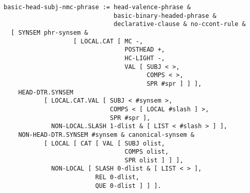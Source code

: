 \documentclass[a4paper]{article}
\begin{document}
{\small\begin{verbatim}
basic-head-subj-nmc-phrase := head-valence-phrase & 
                              basic-binary-headed-phrase &
                              declarative-clause & no-ccont-rule &
  [ SYNSEM phr-synsem & 
                   [ LOCAL.CAT [ MC -,
                                 POSTHEAD +,
                                 HC-LIGHT -,
                                 VAL [ SUBJ < >,
                                       COMPS < >,
                                       SPR #spr ] ] ],
    HEAD-DTR.SYNSEM 
           [ LOCAL.CAT.VAL [ SUBJ < #synsem >,
                             COMPS < [ LOCAL #slash ] >,        
                             SPR #spr ],
             NON-LOCAL.SLASH 1-dlist & [ LIST < #slash > ] ],
    NON-HEAD-DTR.SYNSEM #synsem & canonical-synsem &
           [ LOCAL [ CAT [ VAL [ SUBJ olist,
                                 COMPS olist,
                                 SPR olist ] ] ],
             NON-LOCAL [ SLASH 0-dlist & [ LIST < > ],
                         REL 0-dlist,
                         QUE 0-dlist ] ] ].
\end{verbatim}}
\end{document}
